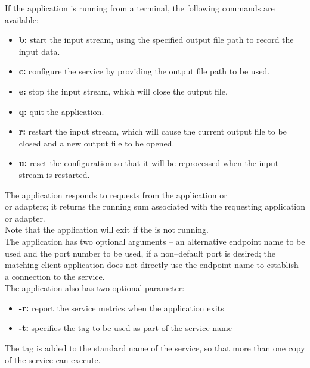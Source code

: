 If the application is running from a terminal, the following commands are available:
\begin{itemize}
\item \textbf{b:} start the input stream, using the specified output file path to record
the input data. 
\item \textbf{c:} configure the service by providing the output file path to be used. 
\item \textbf{e:} stop the input stream, which will close the output file. 
\item \textbf{q:} quit the application. 
\item \textbf{r:} restart the input stream, which will cause the current output file to be
closed and a new output file to be opened.
\item \textbf{u:} reset the configuration so that it will be reprocessed when the input
stream is restarted. 
\end{itemize}
The  application responds to
requests from the  application or\\
 or
 adapters; it returns the running sum
associated with the requesting application or adapter.\\

Note that the application will exit if the
 is not running.\\

The application has two optional arguments -- an alternative endpoint name to be used and
the port number to be used, if a non--default port is desired; the matching client
application does not directly use the endpoint name to establish a connection to the
service.\\

The application also has two optional parameter:
\begin{itemize}
\item \textbf{-r:} report the service metrics when the application exits
\item \textbf{-t:} specifies the tag to be used as part of the service name
\end{itemize}
The tag is added to the standard name of the service, so that more than one copy of the
service can execute.\\

